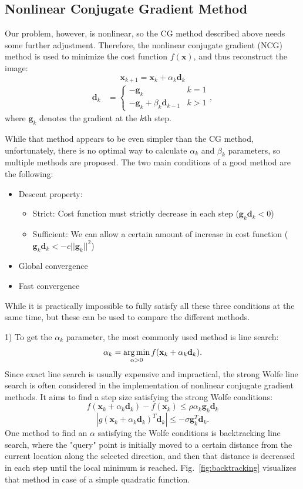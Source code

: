 \subsection{Nonlinear Conjugate Gradient Method}
Our problem, however, is nonlinear, so the CG method described above needs some further adjustment. Therefore, the nonlinear conjugate gradient (NCG) method is used to minimize the cost function $f(\mathbf{x})$, and thus reconstruct the image:
$$\mathbf{x}_{k+1} = \mathbf{x}_k + \alpha_k \mathbf{d}_k$$
\begin{align*}
    \mathbf{d}_k &=
    \begin{cases}
    -\mathbf{g}_k & k = 1 \\
    -\mathbf{g}_k + \beta_k \mathbf{d}_{k-1} & k > 1
    \end{cases},
\end{align*}
where $\mathbf{g}_k$ denotes the gradient at the $k$th step.

While that method appears to be even simpler than the CG method, unfortunately, there is no optimal way to calculate $\alpha_k$ and $\beta_k$ parameters, so multiple methods are proposed. The two main conditions of a good method are the following:
\begin{itemize}
    \item Descent property:
    \begin{itemize}
        \item Strict: Cost function must strictly decrease in each step ($\mathbf{g}_k \mathbf{d}_k < 0$)
        \item Sufficient: We can allow a certain amount of increase in cost function ($\mathbf{g}_k \mathbf{d}_k < -c ||\mathbf{g}_k||^2$)
    \end{itemize}
    \item Global convergence
    \item Fast convergence
\end{itemize}
While it is practically impossible to fully satisfy all these three conditions at the same time, but these can be used to compare the different methods.

1) To get the $\alpha_k$ parameter, the most commonly used method is line search:
$$\alpha_k = \operatorname*{arg\,min}_{\alpha > 0} f(\mathbf{x}_k + \alpha_k \mathbf{d}_k).$$
Since exact line search is usually expensive and impractical, the strong Wolfe line search is often considered in the implementation of nonlinear conjugate gradient methods. It aims to find a step size satisfying the strong Wolfe conditions:
$$f(\mathbf{x}_k + \alpha_k \mathbf{d}_k) - f(\mathbf{x}_k) \leq \rho \alpha_k \mathbf{g}_k \mathbf{d}_k$$
$$|g(\mathbf{x}_k + \alpha_k \mathbf{d}_k)^T \mathbf{d}_k| \leq - \sigma \mathbf{g}_k^T \mathbf{d}_k.$$
One method to find an $\alpha$ satisfying the Wolfe conditions is backtracking line search, where the "query" point is initially moved to a certain distance from the current location along the selected direction, and then that distance is decreased in each step until the local minimum is reached.
Fig.~\ref{fig:backtracking} visualizes that method in case of a simple quadratic function.

